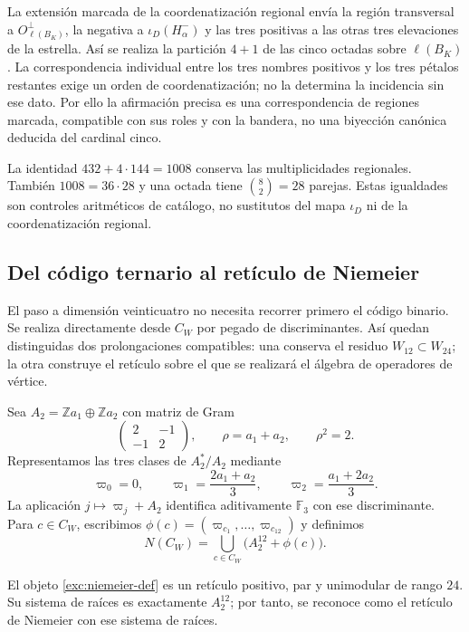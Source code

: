 La extensión marcada de la coordenatización regional envía la región transversal
a $O_{\ell(B_K)}^\perp$, la negativa a $\iota_D(H^-_\alpha)$ y las
tres positivas a las otras tres elevaciones de la estrella. Así se
realiza la partición $4+1$ de las cinco octadas sobre $\ell(B_K)$.
La correspondencia individual entre los tres nombres positivos y
los tres pétalos restantes exige un orden de coordenatización; no la determina
la incidencia sin ese dato. Por ello la afirmación precisa es una
correspondencia de regiones marcada, compatible con sus roles y con
la bandera, no una biyección canónica deducida del cardinal cinco.

La identidad $432+4\cdot144=1008$ conserva las multiplicidades
regionales. También $1008=36\cdot28$ y una octada tiene
$\binom82=28$ parejas. Estas igualdades son controles aritméticos de
catálogo, no sustitutos del mapa $\iota_D$ ni de la coordenatización regional.

\subsection{Del código ternario al retículo de Niemeier}
\label{exc:niemeier}

El paso a dimensión veinticuatro no necesita recorrer primero el
código binario. Se realiza directamente desde $C_W$ por pegado de
discriminantes. Así quedan distinguidas dos prolongaciones compatibles:
una conserva el residuo $W_{12}\subset W_{24}$; la otra construye el
retículo sobre el que se realizará el álgebra de operadores de vértice.

Sea $A_2=\mathbb Z a_1\oplus\mathbb Z a_2$ con matriz de Gram
\[
 \begin{pmatrix}2&-1\\-1&2\end{pmatrix},
 \qquad \rho=a_1+a_2,\qquad \rho^2=2.
\]
Representamos las tres clases de $A_2^*/A_2$ mediante
\[
 \varpi_0=0,\qquad
 \varpi_1=\frac{2a_1+a_2}{3},\qquad
 \varpi_2=\frac{a_1+2a_2}{3}.
\]
La aplicación $j\mapsto\varpi_j+A_2$ identifica aditivamente
$\mathbb F_3$ con ese discriminante. Para $c\in C_W$, escribimos
$\phi(c)=(\varpi_{c_1},\ldots,\varpi_{c_{12}})$ y definimos
\begin{equation}
 N(C_W)=\bigcup_{c\in C_W}\bigl(A_2^{12}+\phi(c)\bigr).
 \label{exc:niemeier-def}
\end{equation}

\begin{theorem}
\label{exc:niemeier-teorema}
El objeto \eqref{exc:niemeier-def} es un retículo positivo, par y
unimodular de rango $24$. Su sistema de raíces es exactamente
$A_2^{12}$; por tanto, se reconoce como el retículo de Niemeier con
ese sistema de raíces.
\end{theorem}

